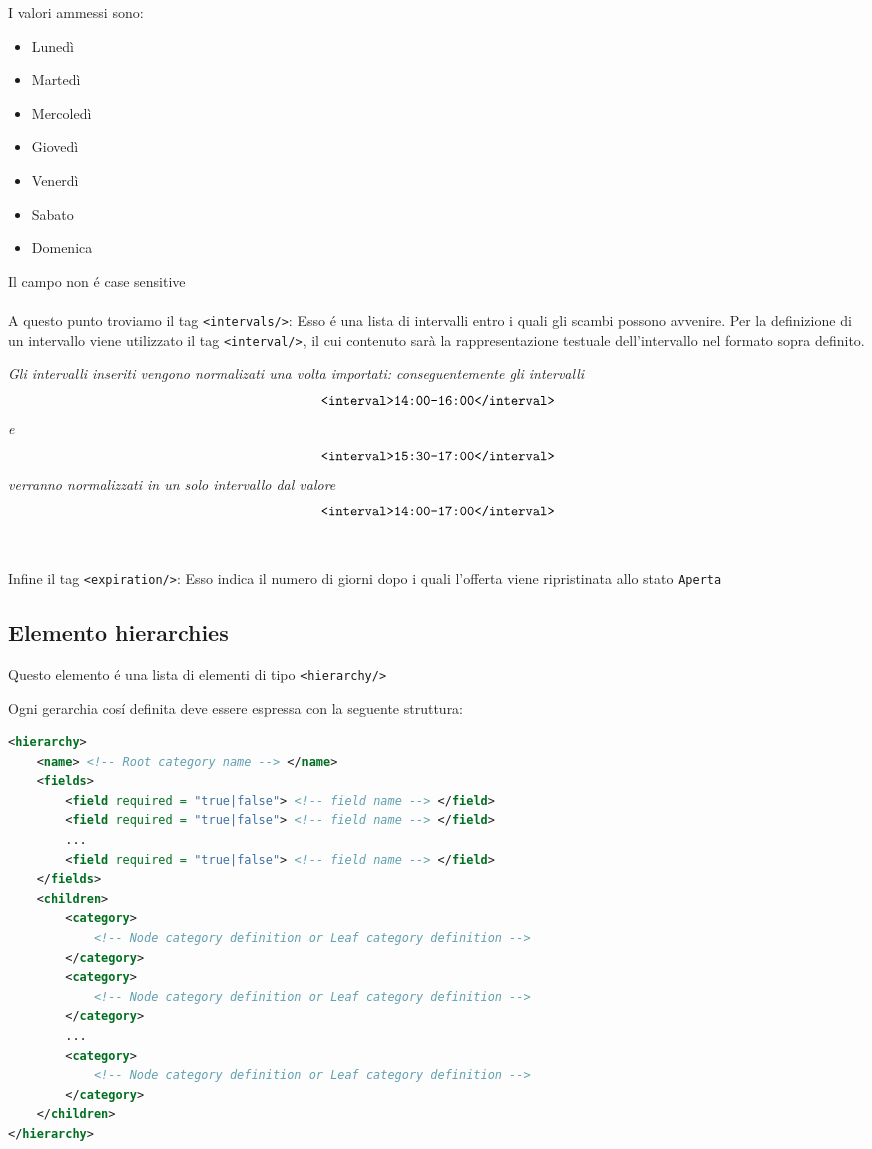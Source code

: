 I valori ammessi sono:
\begin{itemize}
        \item Lunedì
        \item Martedì
        \item Mercoledì
        \item Giovedì
        \item Venerdì
        \item Sabato
        \item Domenica
\end{itemize}
Il campo non é case sensitive
\\\\
A questo punto troviamo il tag \verb|<intervals/>|: Esso é una lista di intervalli entro i quali gli scambi possono avvenire. Per la definizione di un intervallo viene utilizzato il tag \verb|<interval/>|, il cui contenuto sarà la rappresentazione testuale dell'intervallo nel formato sopra definito.

\textit{Gli intervalli inseriti vengono normalizati una volta importati: conseguentemente gli intervalli} \[\verb|<interval>14:00-16:00</interval>|\] \textit{e} \[\verb|<interval>15:30-17:00</interval>|\] \textit{verranno normalizzati in un solo intervallo dal valore} \[\verb|<interval>14:00-17:00</interval>|\]
\\\\
Infine il tag \verb|<expiration/>|: Esso indica il numero di giorni dopo i quali l'offerta viene ripristinata allo stato \texttt{Aperta}

\pagebreak

\subsection{Elemento hierarchies}
Questo elemento é una lista di elementi di tipo \verb|<hierarchy/>|

Ogni gerarchia cosí definita deve essere espressa con la seguente struttura:

\begin{lstlisting}[language=XML]
<hierarchy>
    <name> <!-- Root category name --> </name>
    <fields>
        <field required = "true|false"> <!-- field name --> </field>
        <field required = "true|false"> <!-- field name --> </field>
        ...
        <field required = "true|false"> <!-- field name --> </field>
    </fields>
    <children>
        <category>
            <!-- Node category definition or Leaf category definition -->
        </category>
        <category>
            <!-- Node category definition or Leaf category definition -->
        </category>
        ...
        <category>
            <!-- Node category definition or Leaf category definition -->
        </category>
    </children>
</hierarchy>
\end{lstlisting}

